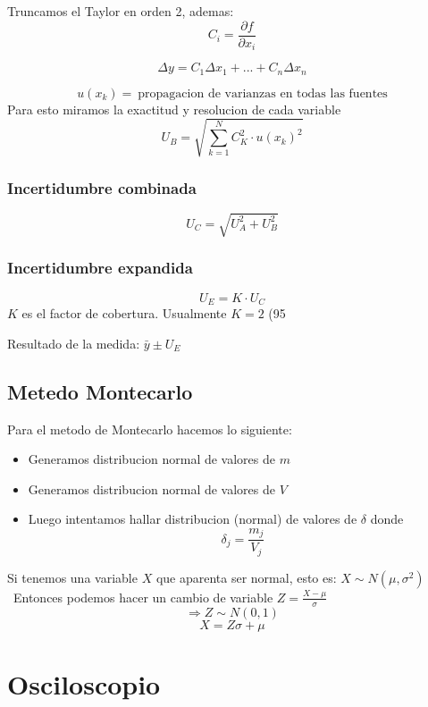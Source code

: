 \documentclass{report}
\begin{document}
Truncamos el Taylor en orden 2, ademas:
$$C_i = \frac{\partial{f}}{\partial{x_i}}$$

$$\Delta y =C_1\Delta x_1 + ... + C_n \Delta x_n$$

$$u(x_k) = ~\text{propagacion de varianzas en todas las fuentes}$$
Para esto miramos la exactitud y resolucion de cada variable
$$\boxed{U_{B} = \sqrt{\sum_{k=1}^{N}{C_K^2}\cdot {u(x_k)}^2}}$$


\subsection{Incertidumbre combinada}

$$U_C = \sqrt{U_A^2 + U_B^2}$$

\subsection{Incertidumbre expandida}

$$U_E = K \cdot U_C$$
$K$ es el factor de cobertura.
Usualmente $K = 2$ (95%

Resultado de la medida: $\bar{y} \pm U_E$

\section{Metedo Montecarlo}

Para el metodo de Montecarlo hacemos lo siguiente:
\begin{itemize}
	\item Generamos distribucion normal de valores de $m$
	\item Generamos distribucion normal de valores de $V$
	\item Luego intentamos hallar distribucion (normal) de valores de $\delta$ donde $$\delta_j = \frac{m_j}{V_j}$$
\end{itemize}

Si tenemos una variable $X$ que aparenta ser normal, esto es: $X\sim N(\mu ,\sigma^2)$ \
Entonces podemos hacer un cambio de variable $Z=\frac{X-\mu}{\sigma}$ \
$$\Rightarrow Z \sim N(0,1)$$
$$X = Z\sigma + \mu$$



\chapter{Osciloscopio}
\end{document}
